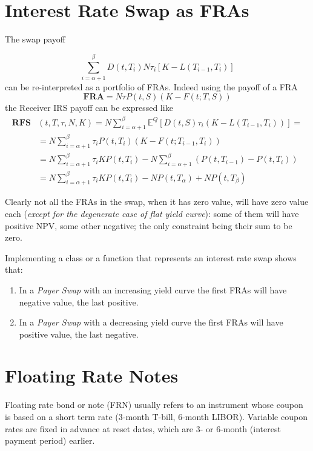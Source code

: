 \documentclass[12pt,a4paper]{article}
\begin{document}
\clearpage
\section{Interest Rate Swap as FRAs}

The swap payoff 

\begin{equation}
	\sum_{i=\alpha+1}^{\beta} D(t,T_i)N \tau_i \left[K-L(T_{i-1},T_i)\right]
	\label{eq:payoff_payer_irs}
\end{equation}	
can be re-interpreted as a portfolio of FRAs. Indeed using the payoff of a FRA
\begin{equation}
	\textbf{FRA}= N\tau P(t,S)(K - F(t;T,S))
	\label{eq:fram_payoff_withF}
\end{equation}
the Receiver IRS payoff can be expressed like
\begin{equation}
	\begin{aligned}
		\textbf{RFS}&(t,T,\tau,N,K) = 	N\sum_{i=\alpha+1}^{\beta}\mathbb{E}^Q[D(t,S)\tau_i(K - L(T_{i-1},T_i))]=\\
		&=N\sum_{i=\alpha+1}^{\beta}\tau_i P(t,T_i)(K-F(t;T_{i-1},T_i))\\
		&=N\sum_{i=\alpha+1}^{\beta}\tau_i KP(t,T_i)-N\sum_{i=\alpha+1}^{\beta}(P(t,T_{i-1})-P(t,T_i)) \\
		&=N\sum_{i=\alpha+1}^{\beta}\tau_i KP(t,T_i)-NP(t,T_\alpha)+NP(t,T_\beta)
	\end{aligned}
\label{eq:swap_as_sum_fra}
\end{equation}

Clearly not all the FRAs in the swap, when it has zero value, will have zero value each (\emph{except for the degenerate case of flat yield curve}): some of them will have positive NPV, some other negative; the only constraint being their sum to be zero.

\begin{question}
Implementing a class or a function that represents an interest rate swap shows that:
\begin{enumerate}
\item In a \emph{Payer Swap} with an increasing yield curve the first FRAs will have negative value, the last positive. 
\item In a \emph{Payer Swap} with a decreasing yield curve the first FRAs will have positive value, the last negative.
\end{enumerate}
\end{question}

\clearpage
\section{Floating Rate Notes}
Floating rate bond or note (FRN) usually refers to an instrument whose coupon is based on a short term rate (3-month T-bill, 6-month LIBOR). Variable coupon rates are fixed in advance at reset dates, which are 3- or 6-month (interest payment period) earlier.
\end{document}
